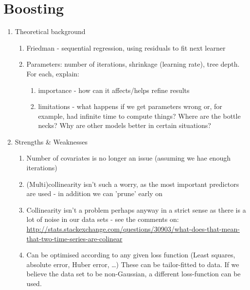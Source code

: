 \documentclass{article}
\begin{document}
\section{Boosting}
\label{sec-4}

\begin{enumerate}
\item Theoretical background
\label{sec-4-1}

\begin{enumerate}
\item Friedman - sequential regression, using residuals to fit next learner
\label{sec-4-1-1}

\item Parameters: number of iterations, shrinkage (learning rate), tree depth. For each, explain:
\label{sec-4-1-2}

\begin{enumerate}
\item importance - how can it affects/helps refine results
\label{sec-4-1-2-1}

\item limitations - what happens if we get parameters wrong or, for example, had infinite time to compute things?
\label{sec-4-1-2-2}
Where are the bottle necks? Why are other models better in certain situations?
\end{enumerate}
\end{enumerate}

\item Strengths \& Weaknesses
\label{sec-4-2}

\begin{enumerate}
\item Number of covariates is no longer an issue (assuming we hae enough iterations)
\label{sec-4-2-1}

\item (Multi)collinearity isn't such a worry, as the most important predictors are used - in addition we can 'prune' early on
\label{sec-4-2-2}

\item Collinearity isn't a problem perhaps anyway in a strict sense as there is a lot of noise in our data sets - see the comments on: \url{http://stats.stackexchange.com/questions/30903/what-does-that-mean-that-two-time-series-are-colinear}
\label{sec-4-2-3}

\item Can be optimised according to any given loss function (Least squares, absolute error, Huber error, \ldots{})
\label{sec-4-2-4}
These can be tailor-fitted to data. If we believe the data set to be non-Gaussian, a different loss-function can be used.


\end{enumerate}
\end{enumerate}
\end{document}
